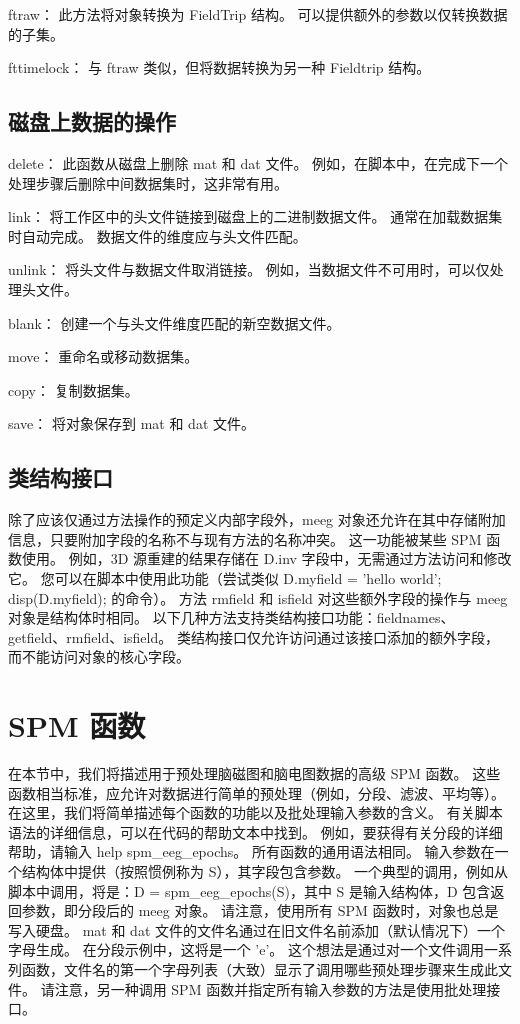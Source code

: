 ftraw：
此方法将对象转换为 FieldTrip 结构。
可以提供额外的参数以仅转换数据的子集。

fttimelock：
与 ftraw 类似，但将数据转换为另一种 Fieldtrip 结构。


\subsection{磁盘上数据的操作}

delete：
此函数从磁盘上删除 mat 和 dat 文件。
例如，在脚本中，在完成下一个处理步骤后删除中间数据集时，这非常有用。

link：
将工作区中的头文件链接到磁盘上的二进制数据文件。
通常在加载数据集时自动完成。
数据文件的维度应与头文件匹配。

unlink：
将头文件与数据文件取消链接。
例如，当数据文件不可用时，可以仅处理头文件。

blank：
创建一个与头文件维度匹配的新空数据文件。

move：
重命名或移动数据集。

copy：
复制数据集。

save：
将对象保存到 mat 和 dat 文件。


\subsection{类结构接口}

除了应该仅通过方法操作的预定义内部字段外，meeg 对象还允许在其中存储附加信息，只要附加字段的名称不与现有方法的名称冲突。
这一功能被某些 SPM 函数使用。
例如，3D 源重建的结果存储在 D.inv 字段中，无需通过方法访问和修改它。
您可以在脚本中使用此功能（尝试类似 D.myfield = 'hello world'; disp(D.myfield); 的命令）。
方法 rmfield 和 isfield 对这些额外字段的操作与 meeg 对象是结构体时相同。
以下几种方法支持类结构接口功能：fieldnames、getfield、rmfield、isfield。
类结构接口仅允许访问通过该接口添加的额外字段，而不能访问对象的核心字段。


\section{SPM 函数}

在本节中，我们将描述用于预处理脑磁图和脑电图数据的高级 SPM 函数。
这些函数相当标准，应允许对数据进行简单的预处理（例如，分段、滤波、平均等）。
在这里，我们将简单描述每个函数的功能以及批处理输入参数的含义。
有关脚本语法的详细信息，可以在代码的帮助文本中找到。
例如，要获得有关分段的详细帮助，请输入 help spm\_eeg\_epochs。
所有函数的通用语法相同。
输入参数在一个结构体中提供（按照惯例称为 S），其字段包含参数。
一个典型的调用，例如从脚本中调用，将是：D = spm\_eeg\_epochs(S)，其中 S 是输入结构体，D 包含返回参数，即分段后的 meeg 对象。
请注意，使用所有 SPM 函数时，对象也总是写入硬盘。
mat 和 dat 文件的文件名通过在旧文件名前添加（默认情况下）一个字母生成。
在分段示例中，这将是一个 'e'。
这个想法是通过对一个文件调用一系列函数，文件名的第一个字母列表（大致）显示了调用哪些预处理步骤来生成此文件。
请注意，另一种调用 SPM 函数并指定所有输入参数的方法是使用批处理接口。


